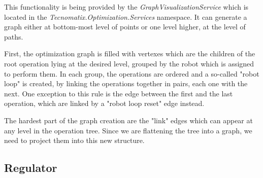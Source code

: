 This functionality is being provided by the \emph{GraphVisualizationService} which is located in the \emph{Tecnomatix.Optimization.Services} namespace. It can generate a graph either at bottom-most level of points or one level higher, at the level of paths.

First, the optimization graph is filled with vertexes which are the children of the root operation lying at the desired level, grouped by the robot which is assigned to perform them. In each group, the operations are ordered and a so-called "robot loop" is created, by linking the operations together in pairs, each one with the next. One exception to this rule is the edge between the first and the last operation, which are linked by a "robot loop reset" edge instead.

The hardest part of the graph creation are the "link" edges which can appear at any level in the operation tree. Since we are flattening the tree into a graph, we need to project them into this new structure. 

\subsection{Regulator}


\
